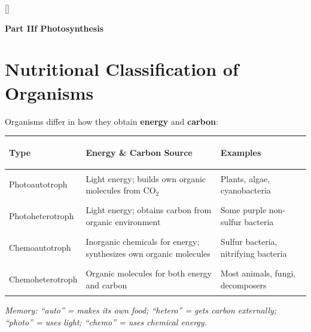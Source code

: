 \documentclass[11pt, letterpaper]{article}
\newcommand{\greensections}{%
  \titleformat{\section}{\large\bfseries\color{sectiongreen}}{}{0em}{}[\color{sectiongreen}\titlerule]%
  \titleformat{\subsection}{\normalsize\bfseries\color{sectiongreen!80!black}}{}{0em}{}%
}
\newcommand{\partbanner}[3]{%
  \begin{tcolorbox}[colback=#1, colframe=#2, boxrule=1.2pt, arc=4pt,
    left=8pt, right=8pt, top=6pt, bottom=6pt]
    \begin{center}{\LARGE\bfseries #3}\end{center}
  \end{tcolorbox}%
}
\begin{document}
\greensections
{}
\partbanner{part2bg}{sectiongreen}{Part IIf \quad Photosynthesis}

\vspace{8pt}

\section*{Nutritional Classification of Organisms}

Organisms differ in how they obtain \textbf{energy} and \textbf{carbon}:

\noindent
{\renewcommand{\arraystretch}{1.5}
\begin{tabularx}{\textwidth}{>{\bfseries\raggedright\arraybackslash}p{3.8cm}>{\raggedright\arraybackslash}X>{\raggedright\arraybackslash}p{4cm}}
\toprule
\rowcolor{tableheadergreen}
\textbf{Type} & \textbf{Energy \& Carbon Source} & \textbf{Examples} \\
\midrule
\rowcolor{rowBg} Photoautotroph   & Light energy; builds own organic molecules from CO$_2$ & Plants, algae, cyanobacteria \\
\rowcolor{rowA}  Photoheterotroph & Light energy; obtains carbon from organic environment & Some purple non-sulfur bacteria \\
\rowcolor{rowBg} Chemoautotroph   & Inorganic chemicals for energy; synthesizes own organic molecules & Sulfur bacteria, nitrifying bacteria \\
\rowcolor{rowA}  Chemoheterotroph & Organic molecules for both energy and carbon & Most animals, fungi, decomposers \\
\bottomrule
\end{tabularx}}

\vspace{4pt}
\textit{Memory: ``auto'' = makes its own food; ``hetero'' = gets carbon externally; ``photo'' = uses light; ``chemo'' = uses chemical energy.}
\end{document}
